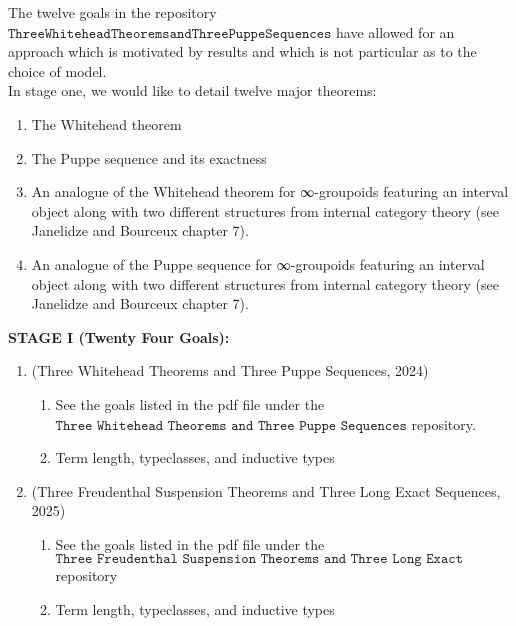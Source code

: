 \documentclass{book}
\newcounter{pcounter}
\newcounter{sectioncount}
\newcounter{subsectioncount}
\renewcommand{\section}[1]{\newpage\ \\ \ \\ \begin{center} \scalebox{1.5}{\texttt{\thesectioncount . #1}} \stepcounter{sectioncount} \setcounter{subsectioncount}{1} \end{center} \begin{center} \ \\ \ \\ \thispagestyle{empty} \end{center}}
\begin{document}
The twelve goals in the repository $\texttt{ThreeWhiteheadTheoremsandThreePuppeSequences}$ have allowed for an approach which is motivated by results and which is not particular as to the choice of model. \\

\iffalse
{\bf Why Model} ...
\fi

\iffalse
https://leanprover.zulipchat.com/#narrow/stream/116395-maths/topic/2-categories
\fi

In stage one, we would like to detail twelve major theorems:

\begin{enumerate}
\item The Whitehead theorem
\item The Puppe sequence and its exactness
\item An analogue of the Whitehead theorem for ∞-groupoids featuring an interval object along with two different structures from internal category theory (see Janelidze and Bourceux chapter 7).
\item An analogue of the Puppe sequence for ∞-groupoids featuring an interval object along with two different structures from internal category theory (see Janelidze and Bourceux chapter 7).
\end{enumerate}

{\bf STAGE I (Twenty Four Goals):}
\begin{enumerate}
\item (Three Whitehead Theorems and Three Puppe Sequences, 2024)
\begin{enumerate}
\item See the goals listed in the pdf file under the $\texttt{Three Whitehead Theorems and Three Puppe Sequences}$ repository.
\item Term length, typeclasses, and inductive types
\end{enumerate}
\item (Three Freudenthal Suspension Theorems and Three Long Exact Sequences, 2025)
\begin{enumerate}
\item See the goals listed in the pdf file under the $\texttt{Three Freudenthal Suspension Theorems and Three Long Exact Sequences}$ repository 
\item Term length, typeclasses, and inductive types
\end{enumerate}
\end{enumerate}



\section{\scalebox{0.6}{Stage II: Goals concerning geometric maps in topos theory and stable homotopy}}
\end{document}

